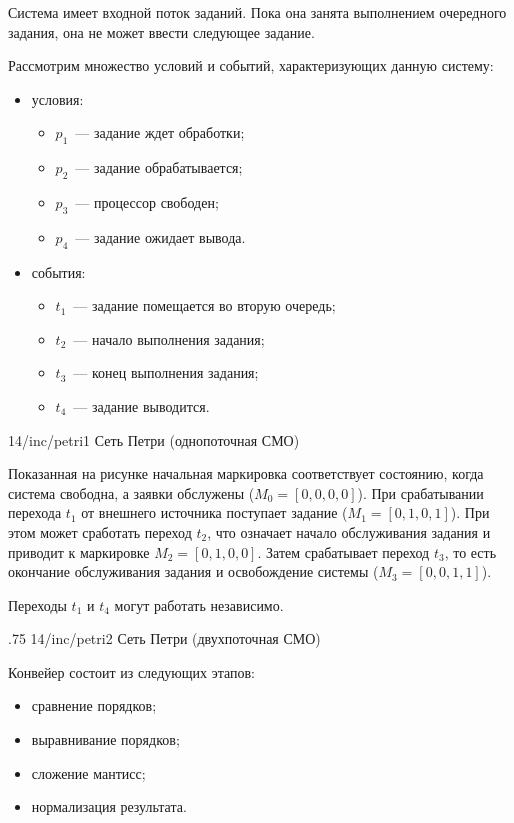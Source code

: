 Система имеет входной поток заданий. Пока она занята выполнением очередного задания, она не может ввести следующее задание.

Рассмотрим множество условий и событий, характеризующих данную систему:

\begin{itemize}
    \item условия:
          \begin{itemize}
              \item $p_1$~--- задание ждет обработки;
              \item $p_2$~--- задание обрабатывается;
              \item $p_3$~--- процессор свободен;
              \item $p_4$~--- задание ожидает вывода.
          \end{itemize}
    \item события:
          \begin{itemize}
              \item $t_1$~--- задание помещается во вторую очередь;
              \item $t_2$~--- начало выполнения задания;
              \item $t_3$~--- конец выполнения задания;
              \item $t_4$~--- задание выводится.
          \end{itemize}
\end{itemize}

\image
{\textwidth}
{14/inc/petri1}
{Сеть Петри (однопоточная СМО)}

Показанная на рисунке начальная маркировка соответствует состоянию, когда система свободна, а заявки обслужены (${M_0=[0,0,0,0]}$). При срабатывании перехода $t_1$ от внешнего источника поступает задание (${M_1=[0,1,0,1]}$). При этом может сработать переход $t_2$, что означает начало обслуживания задания и приводит к маркировке ${M_2=[0,1,0,0]}$. Затем срабатывает переход $t_3$, то есть окончание обслуживания задания и освобождение системы (${M_3=[0,0,1,1]}$).

Переходы $t_1$ и $t_4$ могут работать независимо.

\image
{.75\textwidth}
{14/inc/petri2}
{Сеть Петри (двухпоточная СМО)}

Конвейер состоит из следующих этапов:

\begin{itemize}
    \item сравнение порядков;
    \item выравнивание порядков;
    \item сложение мантисс;
    \item нормализация результата.
\end{itemize}


